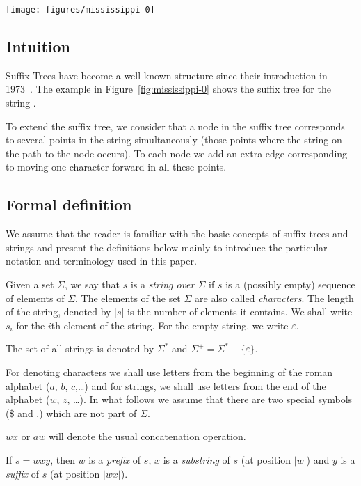 \begin{figure*}
\centering
\texttt{[image: figures/mississippi-0]}
\caption{Suffix tree representation for the string }%
\label{fig:mississippi-0}
\end{figure*}
\subsection{Intuition}
Suffix Trees have become a well known structure since their introduction in 1973~\cite{DBLP:conf/focs/Weiner73}. The example in Figure~\ref{fig:mississippi-0} shows the suffix tree for the string .

To extend the suffix tree, we consider that a node in the suffix tree corresponds to several points in the string simultaneously (those points where the string on the path to the node occurs). To each node we add an extra edge corresponding to moving one character forward in all these points.

\subsection{Formal definition}

We assume that the reader is familiar with the basic concepts of suffix trees and strings and present the definitions below mainly to introduce the particular notation and terminology used in this paper.

\begin{definition}
Given a set $\Sigma$, we say that $s$ is a \emph{string over $\Sigma$} if $s$ is a (possibly empty) sequence of elements of $\Sigma$. The elements of the set $\Sigma$ are also called \emph{characters}. The length of the string, denoted by $|s|$ is the number of elements it contains. We shall write $s_i$ for the $i$th element of the string. For the empty string, we write $\varepsilon$.

The set of all strings is denoted by $\Sigma^*$ and $\Sigma^+=\Sigma^*-\{\varepsilon\}$.
\end{definition}

For denoting characters we shall use letters from the beginning of the roman alphabet ($a$, $b$, $c$,\ldots) and for strings, we shall use letters from the end of the alphabet ($w$, $z$, \ldots). In what follows we assume that there are two special symbols (\$ and $.$) which are not part of $\Sigma$.

\begin{definition}[Concatenation]
$wx$ or $aw$ will denote the usual concatenation operation.

If $s = wxy$, then $w$ is a \emph{prefix} of $s$, $x$ is a \emph{substring} of $s$ (at position $|w|$) and $y$ is a \emph{suffix} of $s$ (at position $|wx|$).
\end{definition}

